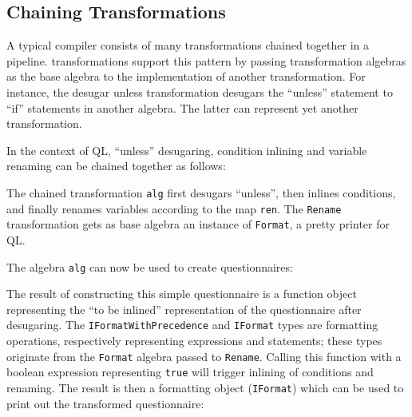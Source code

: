 

\subsection{Chaining Transformations}

A typical compiler consists of many transformations chained together in a pipeline.
\name transformations support this pattern by passing transformation algebras as the base algebra to the implementation of another transformation.
For instance, the desugar unless transformation desugars the ``unless'' statement to ``if'' statements in another algebra.
The latter can represent yet another transformation.

In the context of QL, ``unless'' desugaring, condition inlining and variable renaming can be chained together as follows:


The chained transformation \lstinline{alg} first desugars ``unless'', then inlines conditions, and finally renames variables according to the map \lstinline{ren}.
The \lstinline{Rename} transformation gets as base algebra an instance of \lstinline{Format}, a pretty printer for QL.

The algebra \lstinline{alg} can now be used to create questionnaires:


The result of constructing this simple questionnaire is a function object representing the ``to be inlined'' representation of the questionnaire after desugaring.
The \lstinline{IFormatWithPrecedence} and \lstinline{IFormat} types are  formatting operations, respectively representing expressions and statements; these types originate from the \lstinline{Format} algebra passed to \lstinline{Rename}.
Calling this function with a boolean expression representing \lstinline{true} will trigger inlining of conditions and renaming. The result is then a formatting object (\lstinline{IFormat}) which can be used to print out the transformed questionnaire:


